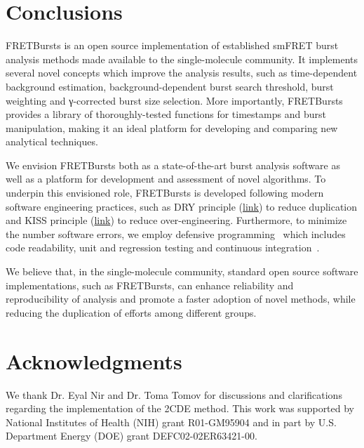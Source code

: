 \section{Conclusions}
\label{sec:conclusions}

FRETBursts is an open source implementation of established smFRET burst analysis methods
made available to the single-molecule community.
It implements several novel concepts which improve the analysis results, such as
time-dependent background estimation, background-dependent burst search threshold,
burst weighting and γ-corrected burst size selection.
More importantly, FRETBursts provides a library of thoroughly-tested functions
for timestamps and burst manipulation, making it an ideal platform for
developing and comparing new analytical techniques.


We envision FRETBursts both as a state-of-the-art burst analysis
software as well as a platform for development and assessment of novel algorithms.
To underpin this envisioned role, FRETBursts is developed following modern 
software engineering practices, such as DRY principle
(\href{http://en.wikipedia.org/wiki/Don\%27t_repeat_yourself}{link})
to reduce duplication and KISS principle
(\href{http://en.wikipedia.org/wiki/KISS_principle}{link})
to reduce over-engineering. Furthermore, to minimize the number software errors,
we employ defensive programming~\cite{Prli__2012} which includes code readability,
unit and regression testing and continuous integration~\cite{Eglen_2016}.

We believe that, in the single-molecule community,
standard open source software implementations, such as FRETBursts, can enhance
reliability and reproducibility of analysis and promote a faster adoption of novel methods, 
while reducing the duplication of efforts among different groups.

\section*{Acknowledgments}
We thank Dr. Eyal Nir and Dr. Toma Tomov for discussions and clarifications regarding the 
implementation of the 2CDE method.
This work was supported by National Institutes of Health (NIH)
grant R01-GM95904 and in part by U.S. Department Energy (DOE) grant DEFC02-02ER63421-00.
